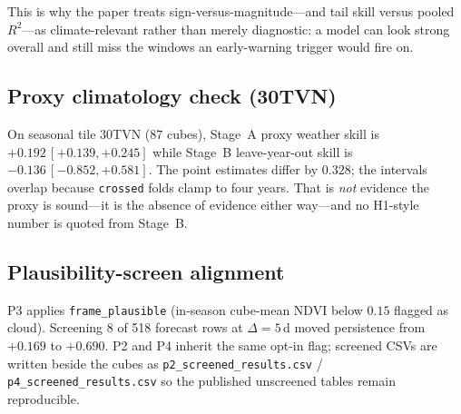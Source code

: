 This is why the paper treats sign-versus-magnitude---and tail skill versus
pooled $R^2$---as climate-relevant rather than merely diagnostic: a model can
look strong overall and still miss the windows an early-warning trigger would
fire on.

\subsection{Proxy climatology check (30TVN)}
On seasonal tile 30TVN (87 cubes), Stage~A proxy weather skill is
$+0.192\,[+0.139,+0.245]$ while Stage~B leave-year-out skill is
$-0.136\,[-0.852,+0.581]$. The point estimates differ by $0.328$; the intervals
overlap because \texttt{crossed} folds clamp to four years. That is
\emph{not} evidence the proxy is sound---it is the absence of evidence either
way---and no H1-style number is quoted from Stage~B.

\subsection{Plausibility-screen alignment}
P3 applies \texttt{frame\_plausible} (in-season cube-mean NDVI below $0.15$
flagged as cloud). Screening 8 of 518 forecast rows at $\Delta=5$\,d moved
persistence from $+0.169$ to $+0.690$. P2 and P4 inherit the same opt-in flag;
screened CSVs are written beside the cubes as
\texttt{p2\_screened\_results.csv} / \texttt{p4\_screened\_results.csv} so the
published unscreened tables remain reproducible.
